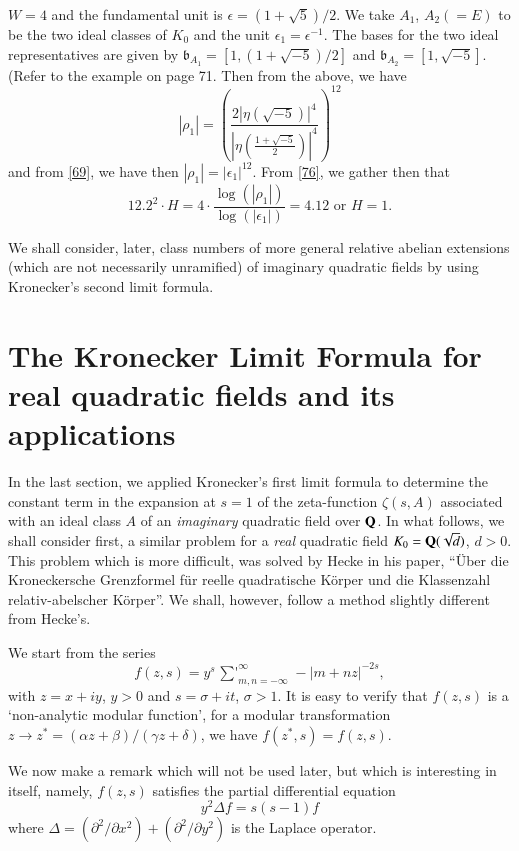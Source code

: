 $W=4$ and the fundamental unit is $\epsilon=(1+\sqrt{5})/2$. We take
$A_{1}$, $A_{2}(=E)$ to be the two ideal classes of $K_{0}$ and the
unit $\epsilon_{1}=\epsilon^{-1}$. The bases for the two ideal
representatives are given by
$\mathfrak{b}_{A_{1}}=[1,(1+\sqrt{-5})/2]$ and
$\mathfrak{b}_{A_{2}}=[1,\sqrt{-5}]$. (Refer to the example on page
71. Then from the above, we have
$$
|\rho_{1}|=\left(
\frac{2|\eta(\sqrt{-5})|^{4}}{\left|\eta\left(\frac{1+\sqrt{-5}}{2}\right)\right|^{4}}\right)^{12} 
$$
and from \eqref{69}, we have then
$|\rho_{1}|=|\epsilon_{1}|^{12}$. From \eqref{76}, we gather then that 
$$
12.2^{2}\cdot H=4\cdot
\frac{\log(|\rho_{1}|)}{\log(|\epsilon_{1}|)}=4.12\text{ \ or \ } H=1.
$$\pageoriginale

We shall consider, later, class numbers of more general relative\break
abelian extensions (which are not necessarily unramified) of imaginary
quadratic fields by using Kronecker's second limit formula.

\section[The Kronecker Limit Formula for...]{The Kronecker Limit Formula for real quadratic fields and its
applications}\label{chap2:sec3} %

In the last section, we applied Kronecker's first limit formula to
determine the constant term in the expansion at $s=1$ of the
zeta-function $\zeta(s,A)$ associated with an ideal class $A$ of an
{\em imaginary} quadratic field over $\mathbf{Q}$. In what follows, we shall
consider first, a similar problem for a {\em real} quadratic field
$K_{0}=\mathbf{Q}(\sqrt{d})$, $d>0$. This problem which is more difficult,
was solved by Hecke in his paper, ``\"Uber die Kroneckersche
Grenzformel f\"ur reelle quadratische K\"orper und die Klassenzahl
relativ-abelscher K\"orper''. We shall, however, follow a method
slightly different from Hecke's.

We start from the series
$$
f(z,s)=y^{s}\mathop{{\sum}'}^{\infty}_{m,n=-\infty}-|m+nz|^{-2s},
$$
with $z=x+iy$, $y>0$ and $s=\sigma +it$, $\sigma>1$. It is easy to
verify that $f(z,s)$ is a `non-analytic modular function', \ie for a
modular transformation $z\to z^{\ast}=(\alpha z+\beta)/(\gamma
z+\delta)$, we have $f(z^{\ast},s)=f(z,s)$.

We now make a remark which will not be used later, but which is
interesting in itself, namely, $f(z,s)$ satisfies the partial
differential equation
\begin{equation*}
y^{2}\Delta f=s(s-1)f\tag{77}\label{77}
\end{equation*}
where $\Delta=(\partial^{2}/\partial x^{2})+(\partial^{2}/\partial
y^{2})$ is the Laplace operator.

